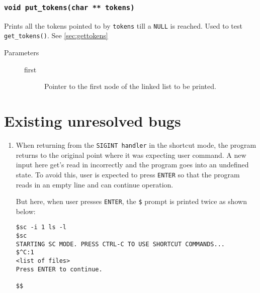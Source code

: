 \documentclass{article}
\begin{document}
\subsubsection{\lstinline{void put_tokens(char ** tokens)}}
Prints all the tokens pointed to by \lstinline{tokens} till a \lstinline{NULL} is reached. Used to test \lstinline{get_tokens()}. See \ref{sec:gettokens}
\begin{description}
	\item[Parameters]\hfill
	\begin{description}
		\item[first] Pointer to the first node of the linked list to be printed.
	\end{description}
\end{description}





\section{Existing unresolved bugs} \label{sec:bugs}
\begin{enumerate}
\item 
When returning from the \lstinline{SIGINT handler} in the shortcut mode, the program returns to the original point where it was expecting user command. A new input here get's read in incorrectly and the program goes into an undefined state. To avoid this, user is expected to press \lstinline{ENTER} so that the program reads in an empty line and can continue operation. 

But here, when user presses \lstinline{ENTER}, the \lstinline{$} prompt is printed twice as shown below:

\begin{lstlisting}
$sc -i 1 ls -l
$sc
STARTING SC MODE. PRESS CTRL-C TO USE SHORTCUT COMMANDS...
$^C:1
<list of files>
Press ENTER to continue.

$$
\end{lstlisting}
\end{enumerate}
\end{document}
